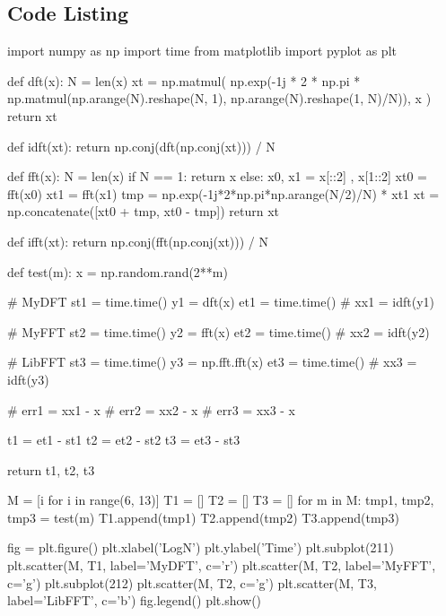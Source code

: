 \documentclass{article}
\begin{document}



\begin{appendices}
\section{Code Listing}
\begin{python}
import numpy as np
import time
from matplotlib import pyplot as plt

def dft(x):
    N = len(x)
    xt = np.matmul(
        np.exp(-1j * 2 * np.pi * np.matmul(np.arange(N).reshape(N, 1), np.arange(N).reshape(1, N)/N)),
        x
        )
    return xt

def idft(xt):
    return np.conj(dft(np.conj(xt))) / N

def fft(x):
    N = len(x)
    if N == 1:
        return x
    else:
        x0, x1 = x[::2] , x[1::2]
        xt0 = fft(x0)
        xt1 = fft(x1)
        tmp = np.exp(-1j*2*np.pi*np.arange(N/2)/N) * xt1
        xt = np.concatenate([xt0 + tmp, xt0 - tmp])
    return xt

def ifft(xt):
    return np.conj(fft(np.conj(xt))) / N

def test(m):
    x = np.random.rand(2**m)

    # MyDFT
    st1 = time.time()
    y1 = dft(x)
    et1 = time.time()
    # xx1 = idft(y1)

    # MyFFT
    st2 = time.time()
    y2 = fft(x)
    et2 = time.time()
    # xx2 = idft(y2)

    # LibFFT
    st3 = time.time()
    y3 = np.fft.fft(x)
    et3 = time.time()
    # xx3 = idft(y3)

    # err1 = xx1 - x
    # err2 = xx2 - x
    # err3 = xx3 - x

    t1 = et1 - st1
    t2 = et2 - st2
    t3 = et3 - st3
    
    return t1, t2, t3


M = [i for i in range(6, 13)]
T1 = []
T2 = []
T3 = []
for m in M:
    tmp1, tmp2, tmp3 = test(m)
    T1.append(tmp1)
    T2.append(tmp2)
    T3.append(tmp3)

fig = plt.figure()
plt.xlabel('LogN')
plt.ylabel('Time')
plt.subplot(211)
plt.scatter(M, T1, label='MyDFT', c='r')
plt.scatter(M, T2, label='MyFFT', c='g')
plt.subplot(212)
plt.scatter(M, T2, c='g')
plt.scatter(M, T3, label='LibFFT', c='b')
fig.legend()
plt.show()
\end{python}
\end{appendices}
\end{document}
